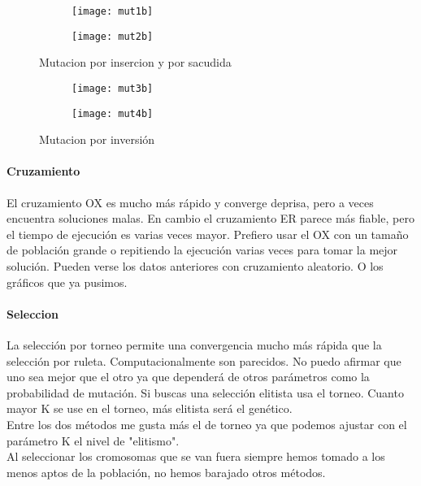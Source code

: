 \documentclass[10pt]{article}
\begin{document}
\begin{figure}
	\begin{subfigure}[H]{0.50\textwidth}
		\texttt{[image: mut1b]}
	\end{subfigure}
	\begin{subfigure}[H]{0.50\textwidth}
		\texttt{[image: mut2b]}
	\end{subfigure}
	\caption{Mutacion por insercion y por sacudida}
	\label{fig:mut1}
\end{figure}
\begin{figure}
	\begin{subfigure}[H]{0.50\textwidth}
		\texttt{[image: mut3b]}
	\end{subfigure}
	\begin{subfigure}[H]{0.50\textwidth}
		\texttt{[image: mut4b]}
	\end{subfigure}
	\caption{Mutacion por inversión}
	\label{fig:mut2}
\end{figure}

\paragraph{Cruzamiento}
El cruzamiento OX es mucho más rápido y converge deprisa, pero a veces encuentra soluciones malas. En cambio el cruzamiento ER parece más fiable, pero el tiempo de ejecución es varias veces mayor. Prefiero usar el OX con un tamaño de población grande o repitiendo la ejecución varias veces para tomar la mejor solución. Pueden verse los datos anteriores con cruzamiento aleatorio. O los gráficos que ya pusimos.
\paragraph{Seleccion}
La selección por torneo permite una convergencia mucho más rápida que la selección por ruleta. Computacionalmente son parecidos. No puedo afirmar que uno sea mejor que el otro ya que dependerá de otros parámetros como la probabilidad de mutación. Si buscas una selección elitista usa el torneo. Cuanto mayor K se use en el torneo, más elitista será el genético. \\
Entre los dos métodos me gusta más el de torneo ya que podemos ajustar con el parámetro K el nivel de "elitismo".\\
Al seleccionar los cromosomas que se van fuera siempre hemos tomado a los menos aptos de la población, no hemos barajado otros métodos.
\end{document}
